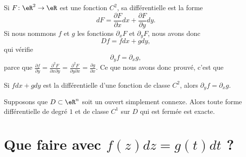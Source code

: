 Si $F\colon \eR^2\to \eR$ est une fonction $C^2$, sa différentielle est la forme
\begin{equation}
    dF=\frac{ \partial F }{ \partial x }dx+\frac{ \partial F }{ \partial y }dy.
\end{equation}
Si nous nommons $f$ et $g$ les fonctions $\partial_xF$ et $\partial_yF$, nous avons donc
\begin{equation}
    Df=fdx+gdy,
\end{equation}
qui vérifie
\begin{equation}
    \partial_yf=\partial_xg,
\end{equation}
parce que $\frac{ \partial f }{ \partial y }=\frac{ \partial^2F  }{ \partial x\partial y }=\frac{ \partial^2F  }{ \partial y\partial x }=\frac{ \partial g }{ \partial x }$. Ce que nous avons donc prouvé, c'est que 
\begin{lemma}
Si $fdx+gdy$ est la différentielle d'une fonction de classe $C^2$, alors $\partial_yf=\partial_xg$.
\end{lemma}

\begin{theorem}        \label{ThoFermeExactFormRappel}
Supposons que $D\subset\eR^n$ soit un ouvert simplement connexe. Alors toute forme différentielle de degré $1$ et de classe $C^1$ sur $D$ qui est fermée est exacte.
\end{theorem}

                    \section{Que faire avec \texorpdfstring{$f(z)dz=g(t)dt$}{fzdz} ?}
\label{SecFairedzdt}

